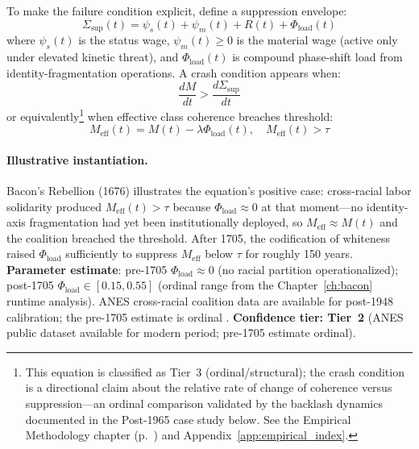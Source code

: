 To make the failure condition explicit, define a suppression envelope:
\begin{equation}\label{eq:1.8-suppression-envelope}
\Sigma_{\text{sup}}(t) = \psi_s(t) + \psi_m(t) + R(t) + \Phi_{\text{load}}(t)
\end{equation}
where $\psi_s(t)$ is the status wage, $\psi_m(t) \geq 0$ is the material wage (active only under elevated kinetic threat), and $\Phi_{\text{load}}(t)$ is compound phase-shift load from identity-fragmentation operations. A crash condition appears when:
\begin{equation}\label{eq:1.9-crash-condition-derivative}
\frac{dM}{dt} > \frac{d\Sigma_{\text{sup}}}{dt}
\end{equation}
or equivalently\footnote{This equation is classified as Tier~3 (ordinal/structural); the crash condition is a directional claim about the relative rate of change of coherence versus suppression---an ordinal comparison validated by the backlash dynamics documented in the Post-1965 case study below. See the Empirical Methodology chapter (p.~\pageref{ch:empirical_methodology}) and Appendix~\ref{app:empirical_index}.} when effective class coherence breaches threshold:
\begin{equation}\label{eq:1.10-effective-coherence}
M_{\text{eff}}(t) = M(t) - \lambda \Phi_{\text{load}}(t), \quad M_{\text{eff}}(t) > \tau
\end{equation}

\paragraph{Illustrative instantiation.}
Bacon's Rebellion (1676) illustrates the equation's positive case: cross-racial labor solidarity produced $M_{\text{eff}}(t) > \tau$ because $\Phi_{\text{load}} \approx 0$ at that moment---no identity-axis fragmentation had yet been institutionally deployed, so $M_{\text{eff}} \approx M(t)$ and the coalition breached the threshold. After 1705, the codification of whiteness raised $\Phi_{\text{load}}$ sufficiently to suppress $M_{\text{eff}}$ below $\tau$ for roughly 150 years. \textbf{Parameter estimate}: pre-1705 $\Phi_{\text{load}} \approx 0$ (no racial partition operationalized); post-1705 $\Phi_{\text{load}} \in [0.15, 0.55]$ (ordinal range from the Chapter~\ref{ch:bacon} runtime analysis). ANES cross-racial coalition data are available for post-1948 calibration; the pre-1705 estimate is ordinal \cite{morgan_american_slavery, anes_cumulative}. \textbf{Confidence tier: Tier~2} (ANES public dataset available for modern period; pre-1705 estimate ordinal).

